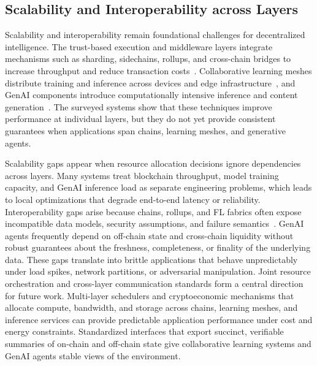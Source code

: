 \documentclass[5p,twocolumn]{elsarticle}
\begin{document}
\subsection{Scalability and Interoperability across Layers}
Scalability and interoperability remain foundational challenges for decentralized intelligence. The trust-based execution and middleware layers integrate mechanisms such as sharding, sidechains, rollups, and cross-chain bridges to increase throughput and reduce transaction costs~\cite{wan2024web3,alsagheer2023decentralized}. Collaborative learning meshes distribute training and inference across devices and edge infrastructure~\cite{luo2024survey,javadpour2024decentralized}, and GenAI components introduce computationally intensive inference and content generation~\cite{huang2024large}. The surveyed systems show that these techniques improve performance at individual layers, but they do not yet provide consistent guarantees when applications span chains, learning meshes, and generative agents.

Scalability gaps appear when resource allocation decisions ignore dependencies across layers. Many systems treat blockchain throughput, model training capacity, and GenAI inference load as separate engineering problems, which leads to local optimizations that degrade end-to-end latency or reliability. Interoperability gaps arise because chains, rollups, and FL fabrics often expose incompatible data models, security assumptions, and failure semantics~\cite{wan2024web3}. GenAI agents frequently depend on off-chain state and cross-chain liquidity without robust guarantees about the freshness, completeness, or finality of the underlying data. These gaps translate into brittle applications that behave unpredictably under load spikes, network partitions, or adversarial manipulation. Joint resource orchestration and cross-layer communication standards form a central direction for future work. Multi-layer schedulers and cryptoeconomic mechanisms that allocate compute, bandwidth, and storage across chains, learning meshes, and inference services can provide predictable application performance under cost and energy constraints. Standardized interfaces that export succinct, verifiable summaries of on-chain and off-chain state give collaborative learning systems and GenAI agents stable views of the environment. 
\end{document}
